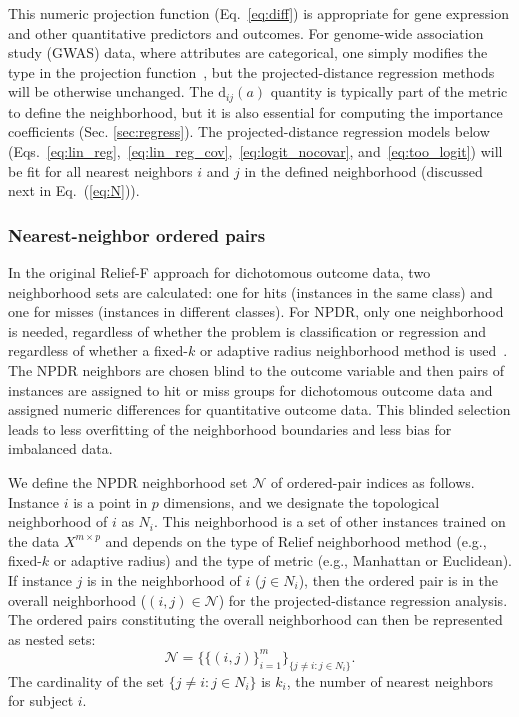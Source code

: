 \documentclass{bioinfo}
\begin{document}
This numeric projection function (Eq.~\ref{eq:diff}) is appropriate for gene expression and other quantitative predictors and outcomes.
For genome-wide association study (GWAS) data, where attributes are categorical, one simply modifies the type in the projection function~\cite{titv}, but the projected-distance regression methods will be otherwise unchanged.
The $\text{d}_{ij}(a)$ quantity is typically part of the metric to define the neighborhood, but it is also essential for computing the importance coefficients (Sec. \ref{sec:regress}).
The projected-distance regression models below (Eqs.~\ref{eq:lin_reg},~\ref{eq:lin_reg_cov},~\ref{eq:logit_nocovar}, and~\ref{eq:too_logit}) will be fit for all nearest neighbors $i$ and $j$ in the defined neighborhood (discussed next in Eq.~(\ref{eq:N})).

\subsubsection{Nearest-neighbor ordered pairs}
In the original Relief-F approach for dichotomous outcome data, two neighborhood sets are calculated: one for hits (instances in the same class) and one for misses (instances in different classes).
For NPDR, only one neighborhood is needed, regardless of whether the problem is classification or regression and regardless of whether a fixed-$k$ or adaptive radius neighborhood method is used~\cite{greene09,urbanowicz17,mckinney13}.
The NPDR neighbors are chosen blind to the outcome variable and then pairs of instances are assigned to hit or miss groups for dichotomous outcome data and assigned numeric differences for quantitative outcome data.
This blinded selection leads to less overfitting of the neighborhood boundaries and less bias for imbalanced data.

We define the NPDR neighborhood set $\mathcal{N}$ of ordered-pair indices as follows.
Instance $i$ is a point in $p$ dimensions, and we designate the topological neighborhood of $i$ as $N_{i}$.
This neighborhood is a set of other instances trained on the data $X^{m \times p}$ and depends on the type of Relief neighborhood method (e.g., fixed-$k$ or adaptive radius) and the type of metric (e.g., Manhattan or Euclidean).
If instance $j$ is in the neighborhood of $i$ ($j \in N_{i}$), then the ordered pair is in the overall neighborhood ($(i,j) \in \mathcal{N}$) for the projected-distance regression analysis.
The ordered pairs constituting the overall neighborhood can then be represented as nested sets:
\begin{equation}\label{eq:N}
\mathcal{N}=\{\{(i, j)\}_{i=1}^{m}\}_{\{j \ne i : j \in N_{i}\}}.
\end{equation}
The cardinality of the set $\{j \ne i : j \in N_{i}\}$ is $k_i$, the number of nearest neighbors for subject $i$.
\end{document}

